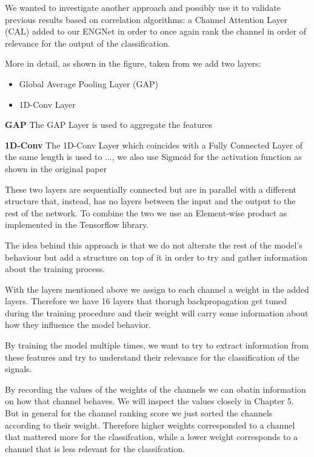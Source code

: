 \documentclass{Configuration_Files/PoliMi3i_thesis}
\begin{document}
We wanted to investigate another approach and possibly use it to validate previous results based on correlation algorithms: a Channel Attention Layer (CAL) added to our ENGNet in order to once again rank the channel in order of relevance for the output of the classification.

More in detail, as shown in the figure, taken from \cite{tongLearnableEEGChannel2023}\cite{zhangMotorImageryRecognition2021} we add two layers:

\begin{itemize}
	\item Global Average Pooling Layer (GAP)
	\item 1D-Conv Layer
\end{itemize}

\textbf{GAP} \quad The GAP Layer is used to aggregate the features

\textbf{1D-Conv} \quad The 1D-Conv Layer which coincides with a Fully Connected Layer of the same length is used to ..., we also use Sigmoid for the activation function as shown in the original paper \cite{tongLearnableEEGChannel2023}

These two layers are sequentially connected but are in parallel with a different structure that, instead, has no layers between the input and the output to the rest of the network.
To combine the two we use an Element-wise product as implemented in the Tensorflow library.

The idea behind this approach is that we do not alterate the rest of the model's behaviour but add a structure on top of it in order to try and gather information about the training process.

With the layers mentioned above we assign to each channel a weight in the added layers.
Therefore we have 16 layers that thorugh backpropagation get tuned during the training procedure and their weight will carry some information about how they influence the model behavior.

By training the model multiple times, we want to try to extract information from these features and try to understand their relevance for the classification of the signals.

By recording the values of the weights of the channels we can obatin information on how that channel behaves.
We will inspect the values closely in Chapter 5.
But in general for the channel ranking score we just sorted the channels according to their weight.
Therefore higher weights corresponded to a channel that mattered more for the classifcation, while a lower weight corresponds to a channel that is less relevant for the classifcation.
\end{document}
